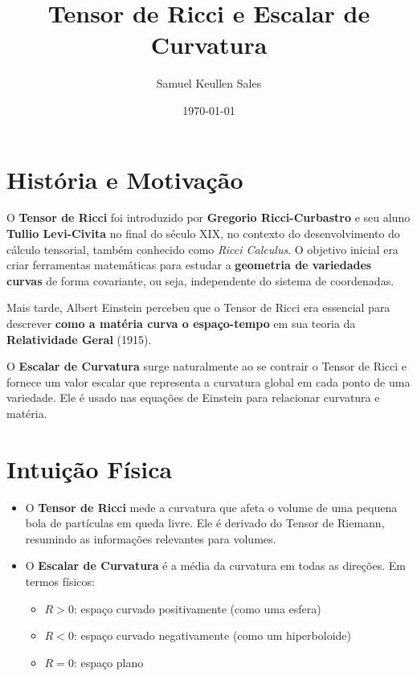 \documentclass[12pt]{article}
\title{Tensor de Ricci e Escalar de Curvatura}
\author{Samuel Keullen Sales}
\date{\today}
\begin{document}
\maketitle

\section{História e Motivação}

O \textbf{Tensor de Ricci} foi introduzido por \textbf{Gregorio Ricci-Curbastro} e seu aluno \textbf{Tullio Levi-Civita} no final do século XIX, no contexto do desenvolvimento do cálculo tensorial, também conhecido como \textit{Ricci Calculus}.  
O objetivo inicial era criar ferramentas matemáticas para estudar a \textbf{geometria de variedades curvas} de forma covariante, ou seja, independente do sistema de coordenadas.

Mais tarde, Albert Einstein percebeu que o Tensor de Ricci era essencial para descrever \textbf{como a matéria curva o espaço-tempo} em sua teoria da \textbf{Relatividade Geral} (1915).

O \textbf{Escalar de Curvatura} surge naturalmente ao se contrair o Tensor de Ricci e fornece um valor escalar que representa a curvatura global em cada ponto de uma variedade. Ele é usado nas equações de Einstein para relacionar curvatura e matéria.

\section{Intuição Física}

\begin{itemize}
    \item O \textbf{Tensor de Ricci} mede a curvatura que afeta o volume de uma pequena bola de partículas em queda livre. Ele é derivado do Tensor de Riemann, resumindo as informações relevantes para volumes.
    \item O \textbf{Escalar de Curvatura} é a média da curvatura em todas as direções. Em termos físicos:
    \begin{itemize}
        \item $R > 0$: espaço curvado positivamente (como uma esfera)
        \item $R < 0$: espaço curvado negativamente (como um hiperboloide)
        \item $R = 0$: espaço plano
    \end{itemize}
\end{itemize}
\end{document}
